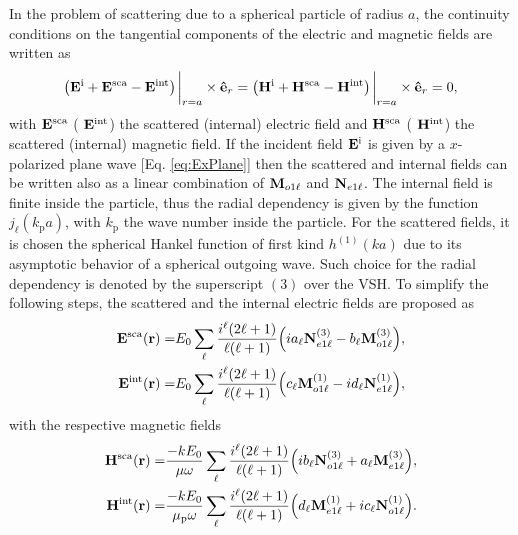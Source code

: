 In the problem of scattering due to a spherical particle of radius $a$, the continuity conditions on the tangential components of the electric and magnetic fields are written as
 \begin{align}
 \qty(\vb{E}^\text{i} + \vb{E}^\text{sca}- \vb{E}^\text{int})\eval_{r=a}\times \vu{e}_r  =
  \qty(\vb{H}^\text{i} + \vb{H}^\text{sca} - \vb{H}^\text{int})\eval_{r=a} \times\vu{e}_r = 0,
  \label{eq:contuinity}
 \end{align}
with  $\vb{E}^\text{sca}$ ( $\vb{E}^\text{int}$) the scattered (internal) electric field and  $\vb{H}^\text{sca}$ ( $\vb{H}^\text{int}$) the scattered (internal) magnetic field. If the incident field $\vb{E}^\text{i}$ is given by a $x$-polarized plane wave [Eq. \eqref{eq:ExPlane}] then the scattered and internal fields can be written also as a linear combination of $\vb{M}_{o1\ell}$ and $\vb{N}_{e1\ell}$. The internal field is finite inside the particle, thus the radial dependency is given by the function $j_\ell(k_\text{p} a)$, with $k_\text{p}$ the wave number inside the particle. For the scattered fields, it is chosen the spherical Hankel function of first kind $h^{(1)}(ka)$ due to its asymptotic behavior of a spherical outgoing wave. Such choice for the radial dependency is denoted by the superscript $(3)$ over the VSH. To simplify the following steps, the scattered and the internal electric fields are proposed as
  \begin{subequations}
 \begin{align}
 \vb{E}^\text{sca} (\vb{r})=& E_0 \sum_\ell\frac{i^\ell(2\ell+1)}{\ell(\ell+1)}\qty(i a_\ell \vb{N}_{e1\ell}^{(3)} -b_\ell \vb{M}_{o1\ell}^{(3)}),
 \label{eq:EscaLC}\\
 \vb{E}^\text{int} (\vb{r})=& E_0 \sum_\ell\frac{i^\ell(2\ell+1)}{\ell(\ell+1)}\qty( c_\ell\vb{M}_{o1\ell}^{(1)} - i d_\ell \vb{N}_{e1\ell}^{(1)}),
 \end{align}
 \label{eq:EscaInt}
 \end{subequations}
with the respective magnetic fields
    \begin{subequations}
 \begin{align}
 \vb{H}^\text{sca} (\vb{r})=& \frac{-kE_0}{\mu\omega} \sum_\ell\frac{i^\ell(2\ell+1)}{\ell(\ell+1)}\qty(i b_\ell \vb{N}_{o1\ell}^{(3)} +a_\ell \vb{M}_{e1\ell}^{(3)}),\\
 \vb{H}^\text{int} (\vb{r})=& \frac{-kE_0}{\mu_\text{p}\omega} \sum_\ell\frac{i^\ell(2\ell+1)}{\ell(\ell+1)}\qty( d_\ell\vb{M}_{e1\ell}^{(1)} + i c_\ell \vb{N}_{o1\ell}^{(1)}).
 \end{align}%
\label{eq:HscaInt}%
 \end{subequations}%
